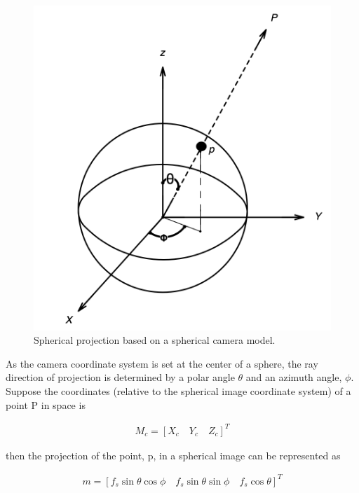 \documentclass[english, LaM, oneside]{sapthesis}%
\begin{document}
\begin{figure}[h]
    \centering
    \includegraphics[scale=0.7]{Images/spherical plane.png}
    \caption{ Spherical projection based on a spherical camera model.}
    \label{fig:spherical plane}
\end{figure}

As the camera coordinate system is set at the center of a sphere, the ray direction of projection is determined by a polar angle $\theta$ and an azimuth angle, $\phi$. Suppose the coordinates (relative to the spherical image coordinate system) of a point P in space is 

\begin{equation}\label{eq:3}
\begin{flalign*}
         M_c = [X_c \quad Y_c \quad Z_c]^T
    \end{flalign*}
\end{equation}

\vspace{0.8cm}

then the projection of the point, p, in a spherical image can be represented as

\begin{equation}\label{eq:4}
\begin{flalign*}
         m = [f_s \sin \theta \cos \phi \quad f_s \sin \theta \sin \phi \quad f_s \cos \theta]^T
    \end{flalign*}
\end{equation}
\end{document}
